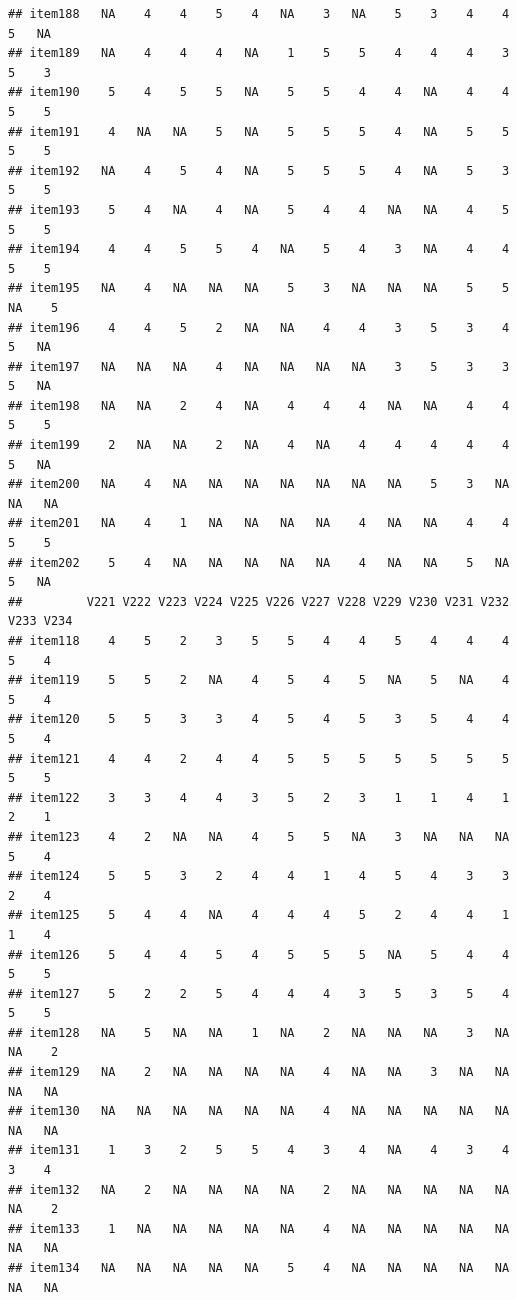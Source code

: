 \documentclass[
  man]{apa6}
\begin{document}
\begin{verbatim}
## item188   NA    4    4    5    4   NA    3   NA    5    3    4    4    5   NA
## item189   NA    4    4    4   NA    1    5    5    4    4    4    3    5    3
## item190    5    4    5    5   NA    5    5    4    4   NA    4    4    5    5
## item191    4   NA   NA    5   NA    5    5    5    4   NA    5    5    5    5
## item192   NA    4    5    4   NA    5    5    5    4   NA    5    3    5    5
## item193    5    4   NA    4   NA    5    4    4   NA   NA    4    5    5    5
## item194    4    4    5    5    4   NA    5    4    3   NA    4    4    5    5
## item195   NA    4   NA   NA   NA    5    3   NA   NA   NA    5    5   NA    5
## item196    4    4    5    2   NA   NA    4    4    3    5    3    4    5   NA
## item197   NA   NA   NA    4   NA   NA   NA   NA    3    5    3    3    5   NA
## item198   NA   NA    2    4   NA    4    4    4   NA   NA    4    4    5    5
## item199    2   NA   NA    2   NA    4   NA    4    4    4    4    4    5   NA
## item200   NA    4   NA   NA   NA   NA   NA   NA   NA    5    3   NA   NA   NA
## item201   NA    4    1   NA   NA   NA   NA    4   NA   NA    4    4    5    5
## item202    5    4   NA   NA   NA   NA   NA    4   NA   NA    5   NA    5   NA
##         V221 V222 V223 V224 V225 V226 V227 V228 V229 V230 V231 V232 V233 V234
## item118    4    5    2    3    5    5    4    4    5    4    4    4    5    4
## item119    5    5    2   NA    4    5    4    5   NA    5   NA    4    5    4
## item120    5    5    3    3    4    5    4    5    3    5    4    4    5    4
## item121    4    4    2    4    4    5    5    5    5    5    5    5    5    5
## item122    3    3    4    4    3    5    2    3    1    1    4    1    2    1
## item123    4    2   NA   NA    4    5    5   NA    3   NA   NA   NA    5    4
## item124    5    5    3    2    4    4    1    4    5    4    3    3    2    4
## item125    5    4    4   NA    4    4    4    5    2    4    4    1    1    4
## item126    5    4    4    5    4    5    5    5   NA    5    4    4    5    5
## item127    5    2    2    5    4    4    4    3    5    3    5    4    5    5
## item128   NA    5   NA   NA    1   NA    2   NA   NA   NA    3   NA   NA    2
## item129   NA    2   NA   NA   NA   NA    4   NA   NA    3   NA   NA   NA   NA
## item130   NA   NA   NA   NA   NA   NA    4   NA   NA   NA   NA   NA   NA   NA
## item131    1    3    2    5    5    4    3    4   NA    4    3    4    3    4
## item132   NA    2   NA   NA   NA   NA    2   NA   NA   NA   NA   NA   NA    2
## item133    1   NA   NA   NA   NA   NA    4   NA   NA   NA   NA   NA   NA   NA
## item134   NA   NA   NA   NA   NA    5    4   NA   NA   NA   NA   NA   NA   NA

\end{verbatim}
\end{document}

